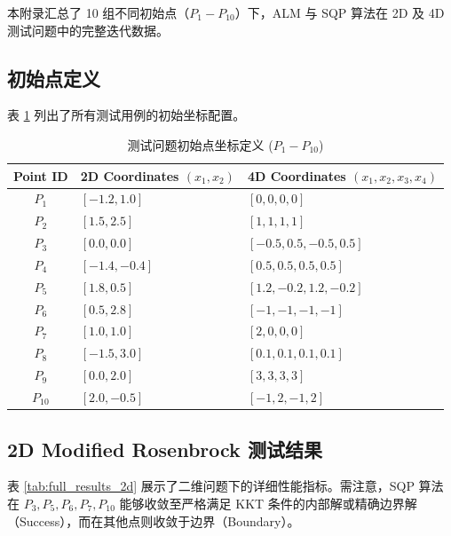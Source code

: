 \documentclass[a4paper,12pt]{article}
\begin{document}
本附录汇总了 10 组不同初始点（$P_1 - P_{10}$）下，ALM 与 SQP 算法在 2D 及 4D 测试问题中的完整迭代数据。

\subsection{初始点定义}
表 \ref{tab:start_points} 列出了所有测试用例的初始坐标配置。

\begin{table}[H]
    \centering
    \caption{测试问题初始点坐标定义 ($P_1 - P_{10}$)}
    \label{tab:start_points}
    \footnotesize
    \begin{tabular}{cll}
        \toprule
        \textbf{Point ID} & \textbf{2D Coordinates} $(x_1, x_2)$ & \textbf{4D Coordinates} $(x_1, x_2, x_3, x_4)$ \\
        \midrule
        $P_1$ & $[-1.2, 1.0]$ & $[0, 0, 0, 0]$ \\
        $P_2$ & $[1.5, 2.5]$  & $[1, 1, 1, 1]$ \\
        $P_3$ & $[0.0, 0.0]$  & $[-0.5, 0.5, -0.5, 0.5]$ \\
        $P_4$ & $[-1.4, -0.4]$& $[0.5, 0.5, 0.5, 0.5]$ \\
        $P_5$ & $[1.8, 0.5]$  & $[1.2, -0.2, 1.2, -0.2]$ \\
        $P_6$ & $[0.5, 2.8]$  & $[-1, -1, -1, -1]$ \\
        $P_7$ & $[1.0, 1.0]$  & $[2, 0, 0, 0]$ \\
        $P_8$ & $[-1.5, 3.0]$ & $[0.1, 0.1, 0.1, 0.1]$ \\
        $P_9$ & $[0.0, 2.0]$  & $[3, 3, 3, 3]$ \\
        $P_{10}$ & $[2.0, -0.5]$& $[-1, 2, -1, 2]$ \\
        \bottomrule
    \end{tabular}
\end{table}

\subsection{2D Modified Rosenbrock 测试结果}
表 \ref{tab:full_results_2d} 展示了二维问题下的详细性能指标。需注意，SQP 算法在 $P_3, P_5, P_6, P_7, P_{10}$ 能够收敛至严格满足 KKT 条件的内部解或精确边界解（Success），而在其他点则收敛于边界（Boundary）。
\end{document}
